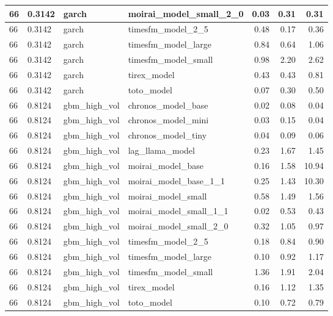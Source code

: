 {\begin{tabular}{llllrrr}
\midrule
66 & 0.3142 & garch & moirai\_model\_small\_2\_0 & 0.03 & 0.31 & 0.31 \\
\midrule
66 & 0.3142 & garch & timesfm\_model\_2\_5 & 0.48 & 0.17 & 0.36 \\
\midrule
66 & 0.3142 & garch & timesfm\_model\_large & 0.84 & 0.64 & 1.06 \\
\midrule
66 & 0.3142 & garch & timesfm\_model\_small & 0.98 & 2.20 & 2.62 \\
\midrule
66 & 0.3142 & garch & tirex\_model & 0.43 & 0.43 & 0.81 \\
\midrule
66 & 0.3142 & garch & toto\_model & 0.07 & 0.30 & 0.50 \\
\midrule
66 & 0.8124 & gbm\_high\_vol & chronos\_model\_base & 0.02 & 0.08 & 0.04 \\
\midrule
66 & 0.8124 & gbm\_high\_vol & chronos\_model\_mini & 0.03 & 0.15 & 0.04 \\
\midrule
66 & 0.8124 & gbm\_high\_vol & chronos\_model\_tiny & 0.04 & 0.09 & 0.06 \\
\midrule
66 & 0.8124 & gbm\_high\_vol & lag\_llama\_model & 0.23 & 1.67 & 1.45 \\
\midrule
66 & 0.8124 & gbm\_high\_vol & moirai\_model\_base & 0.16 & 1.58 & 10.94 \\
\midrule
66 & 0.8124 & gbm\_high\_vol & moirai\_model\_base\_1\_1 & 0.25 & 1.43 & 10.30 \\
\midrule
66 & 0.8124 & gbm\_high\_vol & moirai\_model\_small & 0.58 & 1.49 & 1.56 \\
\midrule
66 & 0.8124 & gbm\_high\_vol & moirai\_model\_small\_1\_1 & 0.02 & 0.53 & 0.43 \\
\midrule
66 & 0.8124 & gbm\_high\_vol & moirai\_model\_small\_2\_0 & 0.32 & 1.05 & 0.97 \\
\midrule
66 & 0.8124 & gbm\_high\_vol & timesfm\_model\_2\_5 & 0.18 & 0.84 & 0.90 \\
\midrule
66 & 0.8124 & gbm\_high\_vol & timesfm\_model\_large & 0.10 & 0.92 & 1.17 \\
\midrule
66 & 0.8124 & gbm\_high\_vol & timesfm\_model\_small & 1.36 & 1.91 & 2.04 \\
\midrule
66 & 0.8124 & gbm\_high\_vol & tirex\_model & 0.16 & 1.12 & 1.35 \\
\midrule
66 & 0.8124 & gbm\_high\_vol & toto\_model & 0.10 & 0.72 & 0.79 \\
\bottomrule
\end{tabular}
}